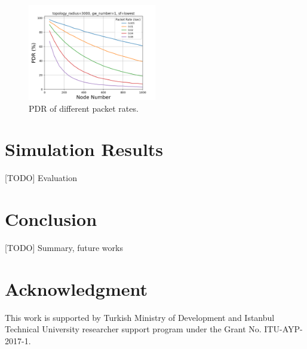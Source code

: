 \documentclass[conference]{IEEEtran}
\begin{document}
\begin{figure}
\centering
\includegraphics[width=0.5\textwidth]{pr_pdr}
\caption{PDR of different packet rates.}
\label{fig:pr_pdr}
\end{figure}


\section{Simulation Results} \label{Simulation Results}
[TODO] Evaluation


\section{Conclusion} \label{Conclusion}
[TODO] Summary, future works
\cite{7815384} \cite{7803607} \cite{7996384} \cite{8090518} \cite{s17061193} \cite{8267219} \cite{8430542} \cite{8319183} \cite{8480649} \cite{AN1200.22} \cite{Bor:2016:LLW:2988287.2989163} \cite{8406255} \cite{DBLP:journals/corr/abs-1802-10338} \cite{finnegan2018comparative}


\section*{Acknowledgment}
This work is supported by Turkish Ministry of Development and Istanbul Technical University researcher support program under the Grant No. ITU-AYP-2017-1.




\end{document}
